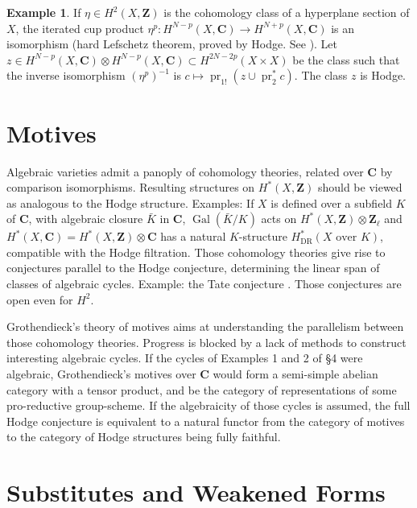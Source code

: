 \documentclass[11pt,a4paper]{article}
\theoremstyle{plain}
\theoremstyle{definition}
\newtheorem{example}[theorem]{Example}
\DeclareMathOperator{\Gal}{Gal}
\DeclareMathOperator{\pr}{pr}
\begin{document}
\begin{example}
If $\eta \in H^{2}(X,\mathbf{Z})$ is the cohomology class of a hyperplane section of $X$, the iterated cup product $\eta^{p} : H^{N-p}(X,\mathbf{C}) \to H^{N+p}(X,\mathbf{C})$ is an isomorphism (hard Lefschetz theorem, proved by Hodge. See \cite[IV.6]{weil1958}). Let $z \in H^{N-p}(X,\mathbf{C}) \otimes H^{N-p}(X,\mathbf{C}) \subset H^{2N-2p}(X \times X)$ be the class such that the inverse isomorphism $(\eta^{p})^{-1}$ is $c \mapsto \pr_{1!}(z \cup \pr_{2}^{*} c)$. The class $z$ is Hodge.
\end{example}

\section{Motives}

Algebraic varieties admit a panoply of cohomology theories, related over $\mathbf{C}$ by comparison isomorphisms. Resulting structures on $H^{*}(X,\mathbf{Z})$ should be viewed as analogous to the Hodge structure. Examples: If $X$ is defined over a subfield $K$ of $\mathbf{C}$, with algebraic closure $\bar{K}$ in $\mathbf{C}$, $\Gal(\bar{K}/K)$ acts on $H^{*}(X,\mathbf{Z}) \otimes \mathbf{Z}_{\ell}$ and $H^{*}(X,\mathbf{C}) = H^{*}(X,\mathbf{Z}) \otimes \mathbf{C}$ has a natural $K$-structure $H_{\text{DR}}^{*}(X \text{ over } K)$, compatible with the Hodge filtration. Those cohomology theories give rise to conjectures parallel to the Hodge conjecture, determining the linear span of classes of algebraic cycles. Example: the Tate conjecture \cite{tate1965}. Those conjectures are open even for $H^{2}$.

Grothendieck's theory of motives aims at understanding the parallelism between those cohomology theories. Progress is blocked by a lack of methods to construct interesting algebraic cycles. If the cycles of Examples 1 and 2 of \S 4 were algebraic, Grothendieck's motives over $\mathbf{C}$ would form a semi-simple abelian category with a tensor product, and be the category of representations of some pro-reductive group-scheme. If the algebraicity of those cycles is assumed, the full Hodge conjecture is equivalent to a natural functor from the category of motives to the category of Hodge structures being fully faithful.

\section{Substitutes and Weakened Forms}
\end{document}
